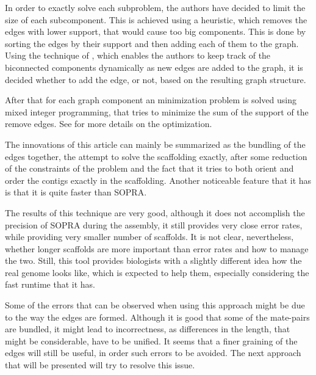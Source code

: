 \documentclass[11pt]{article}
\begin{document}
In order to exactly solve each subproblem, the authors have decided to limit the
size of each subcomponent. This is achieved using a heuristic, which removes the
edges with lower support, that would cause too big components. This is done by
sorting the edges by their support and then adding each of them to the graph.
Using the technique of \cite{westbrook-tarjan}, which enables the authors to
keep track of the biconnected components dynamically as new edges are added to
the graph, it is decided whether to add the edge, or not, based on the resulting
graph structure.

After that for each graph component an minimization problem is solved using
mixed integer programming, that tries to minimize the sum of the support of the
remove edges. See \cite{MIR} for more details on the optimization.

The innovations of this article can mainly be summarized as the bundling of the
edges together, the attempt to solve the scaffolding exactly, after some
reduction of the constraints of the problem and the fact that it tries to both
orient and order the contigs exactly in the scaffolding. Another noticeable
feature that it has is that it is quite faster than SOPRA.

The results of this technique are very good, although it does not accomplish the
precision of SOPRA during the assembly, it still provides very close error
rates, while providing very smaller number of scaffolds. It is not clear,
nevertheless, whether longer scaffolds are more important than error rates and
how to manage the two. Still, this tool provides biologists with a slightly
different idea how the real genome looks like, which is expected to help them,
especially considering the fast runtime that it has.

Some of the errors that can be observed when using this approach might be due to
the way the edges are formed. Although it is good that some of the mate-pairs
are bundled, it might lead to incorrectness, as differences in the length, that
might be considerable, have to be unified. It seems that a finer graining of the
edges will still be useful, in order such errors to be avoided. The next
approach that will be presented will try to resolve this issue.

\end{document}
